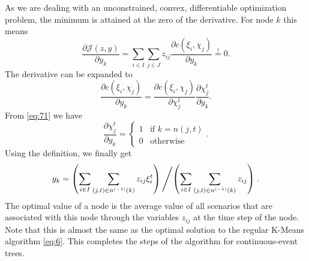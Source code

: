 As we are dealing with an unconstrained, convex, differentiable optimization problem, the minimum is attained at the zero of the derivative.
For node $k$ this means
\begin{equation}
  \label{eq:12}
  \frac{\partial \mathcal{J}(z,y)}{\partial y_k} = \sum_{i\in I}\sum_{j\in J}z_{ij}\frac{\partial c(\xi_i, \chi_j)}{\partial y_k}\overset{!}{=} 0.
\end{equation}
The derivative can be expanded to
\begin{equation}
  \label{eq:13}
  \frac{\partial c(\xi_i, \chi_j)}{\partial y_k} = \frac{\partial c(\xi_i, \chi_j)}{\partial \chi_j^t}\frac{\partial \chi_j^t}{\partial y_k}.
\end{equation}
From \eqref{eq:71} we have
\begin{equation}
  \label{eq:14}
  \frac{\partial \chi_j^t}{\partial y_k} =
  \left\{
    \begin{array}{ll}
      1&\text{if } k = n(j,t)\\0&\text{otherwise}
    \end{array}
  \right. .
\end{equation}
Using the definition, we finally get
\begin{align}
  \label{eq:15}
  y_k = \left(\sum_{i\in I}\sum_{(j,t)\in n^{(-1)}(k)}z_{ij}\xi_i^t \right) \left / \left(\sum_{i\in I}\sum_{(j,t)\in n^{(-1)}(k)}z_{ij}\right)\right. .
\end{align}
The optimal value of a node is the average value of all scenarios that are associated with this node through the variables $z_{ij}$ at the time step of the node.
Note that this is almost the same as the optimal solution to the regular K-Means algorithm \eqref{eq:6}.
This completes the steps of the algorithm for continuous-event trees.


